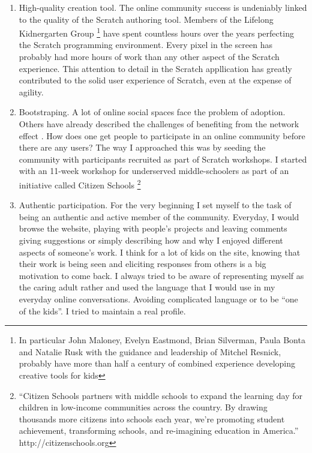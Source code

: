\begin{enumerate}
\item High-quality creation tool.
The online community success is undeniably linked to the quality of the Scratch authoring tool.
Members of the Lifelong Kidnergarten Group \footnote{In particular John Maloney, Evelyn Eastmond, Brian Silverman, Paula Bonta and Natalie Rusk with the guidance and leadership of Mitchel Resnick, probably have more than half a century of combined experience developing creative tools for kids}
have spent countless hours over the years perfecting the Scratch programming environment.
Every pixel in the screen has probably had more hours of work than any other aspect of the Scratch experience.
This attention to detail in the Scratch appllication has greatly contributed to the solid user experience of Scratch, even at the expense of agility.

\item Bootstraping. A lot of online social spaces face the problem of adoption.
Others have already described the challenges of benefiting from the network effect \cite{TODO}. 
How does one get people to participate in an online community before there are any users? 
The way I approached this was by seeding the community with participants recruited as part of Scratch workshops. 
I started with an 11-week workshop for underserved middle-schoolers as part of an initiative called Citizen Schools \footnote{
``Citizen Schools partners with middle schools to expand the learning day for children in low-income communities across the country. By drawing thousands more citizens into schools each year, we’re promoting student achievement, transforming schools, and re-imagining education in America.'' http://citizenschools.org}

\item Authentic participation.
For the very beginning I set myself to the task of being an authentic and active member of the community. Everyday, I would browse the website, playing with people's projects and leaving comments giving suggestions or simply describing how and why I enjoyed different aspects of someone's work. 
I think for a lot of kids on the site, knowing that their work is being seen and eliciting responses from others is a big motivation to come back.
I always tried to be aware of representing myself as the caring adult rather and used the language that I would use in my everyday online conversations.
Avoiding complicated language or to be ``one of the kids''. 
I tried to maintain a real profile.


\end{enumerate}
